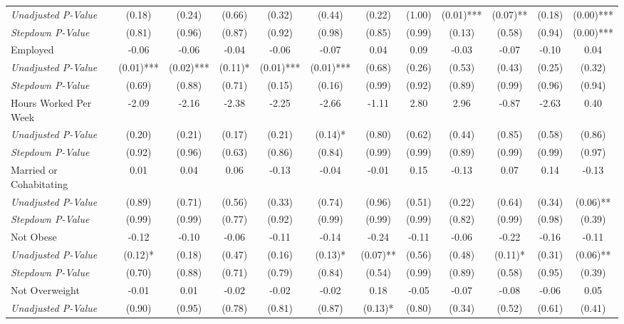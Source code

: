 \begin{tabular}{l c c c c c c c c c c c}
\quad \textit{Unadjusted P-Value} & (0.18) & (0.24) & (0.66) & (0.32) & (0.44) & (0.22) & (1.00) & (0.01)*** & (0.07)** & (0.18) & (0.00)*** \\
\quad \textit{Stepdown P-Value} & (0.81) & (0.96) & (0.87) & (0.92) & (0.98) & (0.85) & (0.99) & (0.13) & (0.58) & (0.94) & (0.00)*** \\
Employed & -0.06 & -0.06 & -0.04 & -0.06 & -0.07 & 0.04 & 0.09 & -0.03 & -0.07 & -0.10 & 0.04 \\
\quad \textit{Unadjusted P-Value} & (0.01)*** & (0.02)*** & (0.11)* & (0.01)*** & (0.01)*** & (0.68) & (0.26) & (0.53) & (0.43) & (0.25) & (0.32) \\
\quad \textit{Stepdown P-Value} & (0.69) & (0.88) & (0.71) & (0.15) & (0.16) & (0.99) & (0.92) & (0.89) & (0.99) & (0.96) & (0.94) \\
Hours Worked Per Week & -2.09 & -2.16 & -2.38 & -2.25 & -2.66 & -1.11 & 2.80 & 2.96 & -0.87 & -2.63 & 0.40 \\
\quad \textit{Unadjusted P-Value} & (0.20) & (0.21) & (0.17) & (0.21) & (0.14)* & (0.80) & (0.62) & (0.44) & (0.85) & (0.58) & (0.86) \\
\quad \textit{Stepdown P-Value} & (0.92) & (0.96) & (0.63) & (0.86) & (0.84) & (0.99) & (0.99) & (0.89) & (0.99) & (0.99) & (0.97) \\
Married or Cohabitating & 0.01 & 0.04 & 0.06 & -0.13 & -0.04 & -0.01 & 0.15 & -0.13 & 0.07 & 0.14 & -0.13 \\
\quad \textit{Unadjusted P-Value} & (0.89) & (0.71) & (0.56) & (0.33) & (0.74) & (0.96) & (0.51) & (0.22) & (0.64) & (0.34) & (0.06)** \\
\quad \textit{Stepdown P-Value} & (0.99) & (0.99) & (0.77) & (0.92) & (0.99) & (0.99) & (0.99) & (0.82) & (0.99) & (0.98) & (0.39) \\
Not Obese & -0.12 & -0.10 & -0.06 & -0.11 & -0.14 & -0.24 & -0.11 & -0.06 & -0.22 & -0.16 & -0.11 \\
\quad \textit{Unadjusted P-Value} & (0.12)* & (0.18) & (0.47) & (0.16) & (0.13)* & (0.07)** & (0.56) & (0.48) & (0.11)* & (0.31) & (0.06)** \\
\quad \textit{Stepdown P-Value} & (0.70) & (0.88) & (0.71) & (0.79) & (0.84) & (0.54) & (0.99) & (0.89) & (0.58) & (0.95) & (0.39) \\
Not Overweight & -0.01 & 0.01 & -0.02 & -0.02 & -0.02 & 0.18 & -0.05 & -0.07 & -0.08 & -0.06 & 0.05 \\
\quad \textit{Unadjusted P-Value} & (0.90) & (0.95) & (0.78) & (0.81) & (0.87) & (0.13)* & (0.80) & (0.34) & (0.52) & (0.61) & (0.41) \\

\end{tabular}
